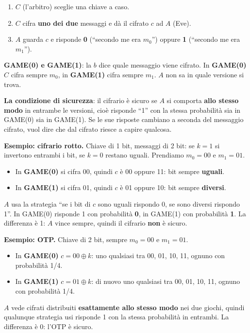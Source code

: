 \begin{enumerate}
\def\labelenumi{\arabic{enumi}.}
\tightlist
\item
  \(C\) (l'arbitro) sceglie una chiave a caso.
\item
  \(C\) cifra \textbf{uno dei due} messaggi e dà il cifrato \(c\) ad \(A\) (Eve).
\item
  \(A\) guarda \(c\) e risponde \textbf{0} (``secondo me era \(m_0\)'') oppure \textbf{1} (``secondo me era \(m_1\)'').
\end{enumerate}

\textbf{GAME(0) e GAME(1)}: la \(b\) dice quale messaggio viene cifrato. In \textbf{GAME(0)} \(C\) cifra sempre \(m_0\), in \textbf{GAME(1)} cifra sempre \(m_1\). \(A\) non sa in quale versione si trova.

\textbf{La condizione di sicurezza}: il cifrario è sicuro se \(A\) si comporta \textbf{allo stesso modo} in entrambe le versioni, cioè risponde ``1'' con la stessa probabilità sia in GAME(0) sia in GAME(1). Se le sue risposte cambiano a seconda del messaggio cifrato, vuol dire che dal cifrato riesce a capire qualcosa.

\begin{esempio}

\textbf{Esempio: cifrario rotto.} Chiave di 1 bit, messaggi di 2 bit: se \(k = 1\) si invertono entrambi i bit, se \(k = 0\) restano uguali. Prendiamo \(m_0 = 00\) e \(m_1 = 01\).

\begin{itemize}
\item
  In \textbf{GAME(0)} si cifra 00, quindi \(c\) è 00 oppure 11: bit sempre \textbf{uguali}.
\item
  In \textbf{GAME(1)} si cifra 01, quindi \(c\) è 01 oppure 10: bit sempre \textbf{diversi}.
\end{itemize}

\(A\) usa la strategia ``se i bit di \(c\) sono uguali rispondo 0, se sono diversi rispondo 1''. In GAME(0) risponde 1 con probabilità \textbf{0}, in GAME(1) con probabilità \textbf{1}. La differenza è 1: \(A\) vince sempre, quindi il cifrario \textbf{non} è sicuro.

\end{esempio}

\begin{esempio}

\textbf{Esempio: OTP.} Chiave di 2 bit, sempre \(m_0 = 00\) e \(m_1 = 01\).

\begin{itemize}
\item
  In \textbf{GAME(0)} \(c = 00 \oplus k\): uno qualsiasi tra 00, 01, 10, 11, ognuno con probabilità 1/4.
\item
  In \textbf{GAME(1)} \(c = 01 \oplus k\): di nuovo uno qualsiasi tra 00, 01, 10, 11, ognuno con probabilità 1/4.
\end{itemize}

\(A\) vede cifrati distribuiti \textbf{esattamente allo stesso modo} nei due giochi, quindi qualunque strategia usi risponde 1 con la stessa probabilità in entrambi. La differenza è 0: l'OTP è sicuro.

\end{esempio}

